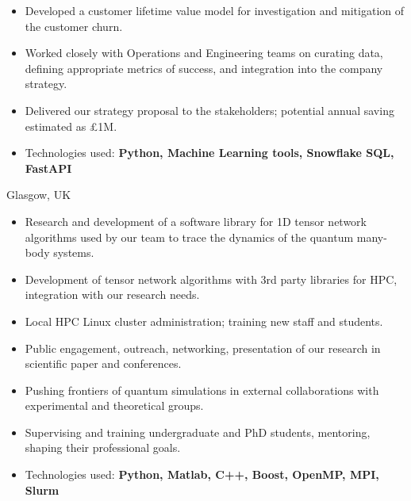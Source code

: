\documentclass[10pt,a4paper,ragged2e,withhyper]{altacv}
\begin{document}
\begin{paracol}{2}
\begin{itemize}
    \item Developed a customer lifetime value model for investigation and
    mitigation of the customer churn.

    \item Worked closely with Operations and Engineering teams on curating data,
    defining appropriate metrics of success, and integration into the company
    strategy.

    \item Delivered our strategy proposal to the stakeholders; 
    potential annual saving estimated as £1M.

    \item Technologies used: 
    {\bf Python, Machine Learning tools, Snowflake SQL, FastAPI}
\end{itemize}

\newpage

{Glasgow, UK}

\begin{itemize}
    \item Research and development of a software library for 1D tensor network
    algorithms used by our team to trace the dynamics of the quantum many-body
    systems.

    \item Development of tensor network algorithms with 3rd party libraries
    for HPC, integration with our research needs.

    \item Local HPC Linux cluster administration;
    training new staff and students.

    \item Public engagement, outreach, networking, presentation of our research
    in scientific paper and conferences.
    
    \item Pushing frontiers of quantum simulations in external collaborations
    with experimental and theoretical groups.

    \item Supervising and training undergraduate and PhD students, mentoring,
    shaping their professional goals.

    \item Technologies used:
    {\bf Python, Matlab, C++, Boost, OpenMP, MPI, Slurm}
\end{itemize}

\divider


\end{paracol}
\end{document}

